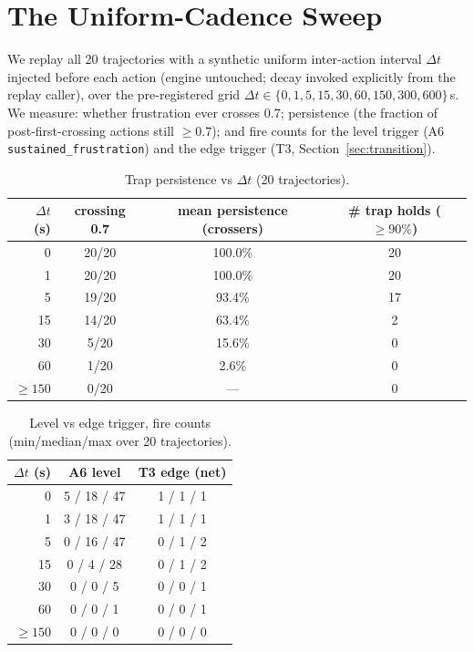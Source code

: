 \section{The Uniform-Cadence Sweep}
\label{sec:sweep}

We replay all 20 trajectories with a synthetic uniform inter-action interval
$\Delta t$ injected before each action (engine untouched; decay invoked
explicitly from the replay caller), over the pre-registered grid
$\Delta t \in \{0, 1, 5, 15, 30, 60, 150, 300, 600\}$\,s. We measure: whether
frustration ever crosses 0.7; persistence (the fraction of post-first-crossing
actions still $\ge 0.7$); and fire counts for the level trigger (A6
\texttt{sustained\_frustration}) and the edge trigger (T3,
Section~\ref{sec:transition}).

\begin{table}[t]
\centering
\caption{Trap persistence vs $\Delta t$ (20 trajectories).}
\label{tab:persistence}
\begin{tabular}{rccc}
\toprule
$\Delta t$ (s) & crossing 0.7 & mean persistence (crossers) & \# trap holds ($\ge 90\%$) \\
\midrule
0   & 20/20 & 100.0\% & 20 \\
1   & 20/20 & 100.0\% & 20 \\
5   & 19/20 & 93.4\%  & 17 \\
15  & 14/20 & 63.4\%  & 2  \\
30  & 5/20  & 15.6\%  & 0  \\
60  & 1/20  & 2.6\%   & 0  \\
$\ge 150$ & 0/20 & --- & 0 \\
\bottomrule
\end{tabular}
\end{table}

\begin{table}[t]
\centering
\caption{Level vs edge trigger, fire counts (min/median/max over 20
trajectories).}
\label{tab:levelvedge}
\begin{tabular}{rcc}
\toprule
$\Delta t$ (s) & A6 level & T3 edge (net) \\
\midrule
0   & 5 / 18 / 47 & 1 / 1 / 1 \\
1   & 3 / 18 / 47 & 1 / 1 / 1 \\
5   & 0 / 16 / 47 & 0 / 1 / 2 \\
15  & 0 / 4 / 28  & 0 / 1 / 2 \\
30  & 0 / 0 / 5   & 0 / 0 / 1 \\
60  & 0 / 0 / 1   & 0 / 0 / 1 \\
$\ge 150$ & 0 / 0 / 0 & 0 / 0 / 0 \\
\bottomrule
\end{tabular}
\end{table}

